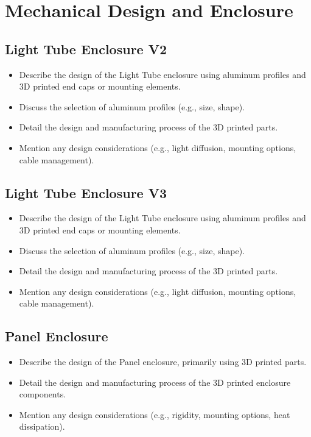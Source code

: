 \section{Mechanical Design and Enclosure}
\label{sec:mechanical_design}

\subsection{Light Tube Enclosure V2}
\label{subsec:light_tube_enclosure_v2}
\begin{itemize}
	\item Describe the design of the Light Tube enclosure using aluminum profiles and 3D printed end caps or mounting elements.
	\item Discuss the selection of aluminum profiles (e.g., size, shape).
	\item Detail the design and manufacturing process of the 3D printed parts.
	\item Mention any design considerations (e.g., light diffusion, mounting options, cable management).
\end{itemize}

\subsection{Light Tube Enclosure V3}
\label{subsec:light_tube_enclosure_v3}
\begin{itemize}
	\item Describe the design of the Light Tube enclosure using aluminum profiles and 3D printed end caps or mounting elements.
	\item Discuss the selection of aluminum profiles (e.g., size, shape).
	\item Detail the design and manufacturing process of the 3D printed parts.
	\item Mention any design considerations (e.g., light diffusion, mounting options, cable management).
\end{itemize}

\subsection{Panel Enclosure}
\label{subsec:panel_enclosure}
\begin{itemize}
	\item Describe the design of the Panel enclosure, primarily using 3D printed parts.
	\item Detail the design and manufacturing process of the 3D printed enclosure components.
	\item Mention any design considerations (e.g., rigidity, mounting options, heat dissipation).
\end{itemize}

